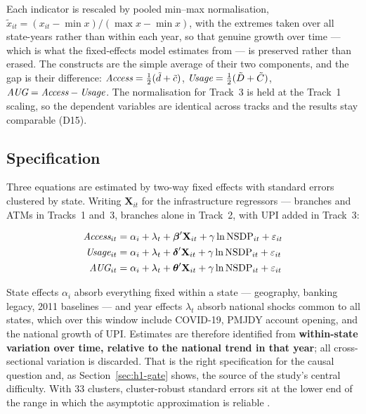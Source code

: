 \noindent
Each indicator is rescaled by pooled min--max normalisation,
$\tilde{x}_{it} = (x_{it} - \min x)/(\max x - \min x)$, with the extremes taken over all
state-years rather than within each year, so that genuine growth over time --- which is what the
fixed-effects model estimates from --- is preserved rather than erased. The constructs are the
simple average of their two components, and the gap is their difference:
$\textit{Access}{} = \frac{1}{2}(\tilde{d} + \tilde{c})$,
$\textit{Usage}{} = \frac{1}{2}(\tilde{D} + \tilde{C})$,
$\textit{AUG}{} = \textit{Access}{} - \textit{Usage}{}$. The normalisation for Track~3 is held at the Track~1 scaling, so
the dependent variables are identical across tracks and the results stay comparable (D15).

\subsection{Specification}
\label{sec:h1-spec}

Three equations are estimated by two-way fixed effects with standard errors clustered by state.
Writing $\mathbf{X}_{it}$ for the infrastructure regressors --- branches and ATMs in Tracks~1
and~3, branches alone in Track~2, with UPI added in Track~3:

\begin{align}
\textit{Access}{}_{it} &= \alpha_i + \lambda_t + \boldsymbol{\beta}'\mathbf{X}_{it}
                  + \gamma \ln\mathrm{NSDP}_{it} + \varepsilon_{it} \label{eq:access}\\[1pt]
\textit{Usage}{}_{it}  &= \alpha_i + \lambda_t + \boldsymbol{\delta}'\mathbf{X}_{it}
                  + \gamma \ln\mathrm{NSDP}_{it} + \varepsilon_{it} \label{eq:usage}\\[1pt]
\textit{AUG}{}_{it}    &= \alpha_i + \lambda_t + \boldsymbol{\theta}'\mathbf{X}_{it}
                  + \gamma \ln\mathrm{NSDP}_{it} + \varepsilon_{it} \label{eq:aug}
\end{align}

State effects $\alpha_i$ absorb everything fixed within a state --- geography, banking legacy,
2011 baselines --- and year effects $\lambda_t$ absorb national shocks common to all states, which
over this window include COVID-19, PMJDY account opening, and the national growth of UPI. Estimates
are therefore identified from \textbf{within-state variation over time, relative to the national
trend in that year}; all cross-sectional variation is discarded. That is the right specification
for the causal question and, as Section~\ref{sec:h1-gate} shows, the source of the study's central
difficulty. With 33 clusters, cluster-robust standard errors sit at the lower end of the range in
which the asymptotic approximation is reliable \citep{cameron2015}.

